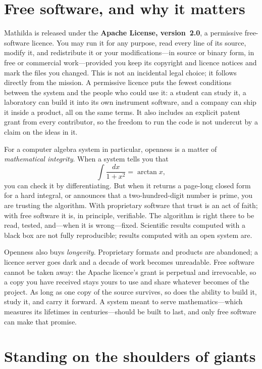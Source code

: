 \section{Free software, and why it matters}
\label{sec:license}

%
Mathilda is released under the \textbf{Apache License, version~2.0}, a permissive
free-software licence. You may run it for any purpose, read every line of its
source, modify it, and redistribute it or your modifications---in source or binary
form, in free or commercial work---provided you keep its copyright and licence
notices and mark the files you changed. This is not an incidental legal choice; it
follows directly from the mission. A permissive licence puts the fewest conditions
between the system and the people who could use it: a student can study it, a
laboratory can build it into its own instrument software, and a company can ship it
inside a product, all on the same terms. It also includes an explicit patent grant
from every contributor, so the freedom to run the code is not undercut by a claim on
the ideas in it.

For a computer algebra system in particular, openness is a matter of
\emph{mathematical integrity}. When a system tells you that
\[
  \int \frac{dx}{1+x^{2}} = \arctan x,
\]
you can check it by differentiating. But when it returns a page-long closed form
for a hard integral, or announces that a two-hundred-digit number is prime, you
are trusting the algorithm. With proprietary software that trust is an act of
faith; with free software it is, in principle, verifiable. The algorithm is right
there to be read, tested, and---when it is wrong---fixed. Scientific results
computed with a black box are not fully reproducible; results computed with an
open system are.

Openness also buys \emph{longevity}. Proprietary formats and products are
abandoned; a licence server goes dark and a decade of work becomes unreadable.
Free software cannot be taken away: the Apache licence's grant is perpetual and
irrevocable, so a copy you have received stays yours to use and share whatever
becomes of the project. As long as one copy of the source survives, so
does the ability to build it, study it, and carry it forward. A system meant to
serve mathematics---which measures its lifetimes in centuries---should be built to
last, and only free software can make that promise.

\section{Standing on the shoulders of giants}
\label{sec:libraries}

